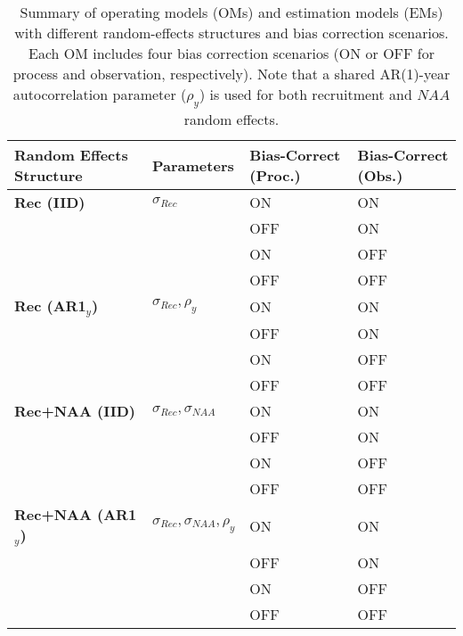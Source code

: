 \begin{table}[H]
\centering
\caption{Summary of operating models (OMs) and estimation models (EMs) with different random-effects structures and bias correction scenarios. Each OM includes four bias correction scenarios (ON or OFF for process and observation, respectively).  Note that a shared AR(1)-year autocorrelation parameter ($\rho_y$) is used for both recruitment and $NAA$ random effects.}
\label{OM_scenario_table}
\begin{scriptsize} %
\begin{tabular}{p{3cm} p{3cm} p{3.5cm} p{3.5cm}} %
\toprule
\textbf{Random Effects Structure} & \textbf{Parameters} & \textbf{Bias-Correct (Proc.)} & \textbf{Bias-Correct (Obs.)} \\
\midrule
\textbf{Rec (IID)} & $\sigma_{Rec}$ & ON & ON \\
                         &                                          & OFF & ON \\
                         &                                          & ON  & OFF \\
                         &                                          & OFF & OFF \\
\midrule
\textbf{Rec (AR1\(_y\))} & $\sigma_{Rec}, \rho_y$ & ON & ON \\
                         &                                          & OFF & ON \\
                         &                                          & ON  & OFF \\
                         &                                          & OFF & OFF \\
\midrule
\textbf{Rec+NAA (IID)} & $\sigma_{Rec}, \sigma_{NAA}$ & ON & ON \\
                         &                                          & OFF & ON \\
                         &                                          & ON  & OFF \\
                         &                                          & OFF & OFF \\
\midrule
\textbf{Rec+NAA (AR1\(_y\))} & $\sigma_{Rec}, \sigma_{NAA}, \rho_y$ & ON & ON \\
                         &                                          & OFF & ON \\
                         &                                          & ON  & OFF \\
                         &                                          & OFF & OFF \\
\bottomrule
\end{tabular}
\end{scriptsize}
\end{table}
